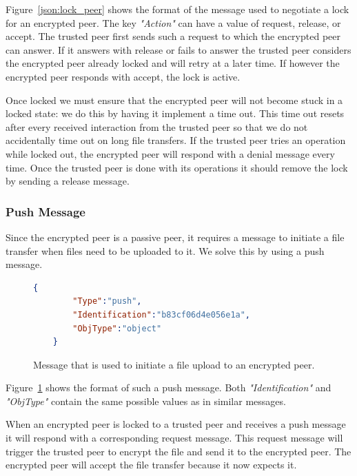 Figure~\ref{json:lock_peer} shows the format of the message used to negotiate a lock for an encrypted peer.
The key \textit{"Action"} can have a value of request, release, or accept.
The trusted peer first sends such a request to which the encrypted peer can answer.
If it answers with release or fails to answer the trusted peer considers the encrypted peer already locked and will retry at a later time.
If however the encrypted peer responds with accept, the lock is active.

Once locked we must ensure that the encrypted peer will not become stuck in a locked state: we do this by having it implement a time out.
This time out resets after every received interaction from the trusted peer so that we do not accidentally time out on long file transfers.
If the trusted peer tries an operation while locked out, the encrypted peer will respond with a denial message every time.
Once the trusted peer is done with its operations it should remove the lock by sending a release message.

\subsubsection{Push Message}
\label{subs:Push Message}

Since the encrypted peer is a passive peer, it requires a message to initiate a file transfer when files need to be uploaded to it.
We solve this by using a push message.

\begin{figure}[htp]
    \begin{lstlisting}[language=json,firstnumber=0]
    {
        "Type":"push",
        "Identification":"b83cf06d4e056e1a",
        "ObjType":"object"
    }
    \end{lstlisting}
\caption[Push Message]{Message that is used to initiate a file upload to an encrypted peer.}
\label{json:push_message}
\end{figure}

Figure~\ref{json:push_message} shows the format of such a push message.
Both \textit{"Identification"} and \textit{"ObjType"} contain the same possible values as in similar messages.

When an encrypted peer is locked to a trusted peer and receives a push message it will respond with a corresponding request message.
This request message will trigger the trusted peer to encrypt the file and send it to the encrypted peer.
The encrypted peer will accept the file transfer because it now expects it.

